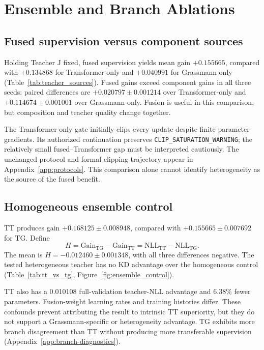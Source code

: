\section{Ensemble and Branch Ablations}
\label{sec:controls}

\subsection{Fused supervision versus component sources}
\label{sec:source-ablation}

Holding Teacher J fixed, fused supervision yields mean gain $+0.155665$, compared with $+0.134868$ for Transformer-only and $+0.040991$ for Grassmann-only (Table~\ref{tab:teacher_sources}). Fused gains exceed component gains in all three seeds: paired differences are $+0.020797\pm0.001214$ over Transformer-only and $+0.114674\pm0.001001$ over Grassmann-only. Fusion is useful in this comparison, but composition and teacher quality change together.

The Transformer-only gate initially clips every update despite finite parameter gradients. Its authorized continuation preserves \texttt{CLIP\_SATURATION\_WARNING}; the relatively small fused--Transformer gap must be interpreted cautiously. The unchanged protocol and formal clipping trajectory appear in Appendix~\ref{app:protocols}. This comparison alone cannot identify heterogeneity as the source of the fused benefit.

\subsection{Homogeneous ensemble control}
\label{sec:homogeneous-control}

TT produces gain $+0.168125\pm0.008948$, compared with $+0.155665\pm0.007692$ for TG. Define
\begin{equation}
H=\mathrm{Gain}_{\mathrm{TG}}-\mathrm{Gain}_{\mathrm{TT}}
=\mathrm{NLL}_{\mathrm{TT}}-\mathrm{NLL}_{\mathrm{TG}}.
\label{eq:ensemble-contrast}
\end{equation}
The mean is $H=-0.012460\pm0.001348$, with all three differences negative. The tested heterogeneous teacher has no KD advantage over the homogeneous control (Table~\ref{tab:tt_vs_tg}, Figure~\ref{fig:ensemble_control}).

TT also has a 0.010108 full-validation teacher-NLL advantage and 6.38\% fewer parameters. Fusion-weight learning rates and training histories differ. These confounds prevent attributing the result to intrinsic TT superiority, but they do not support a Grassmann-specific or heterogeneity advantage. TG exhibits more branch disagreement than TT without producing more transferable supervision (Appendix~\ref{app:branch-diagnostics}).


